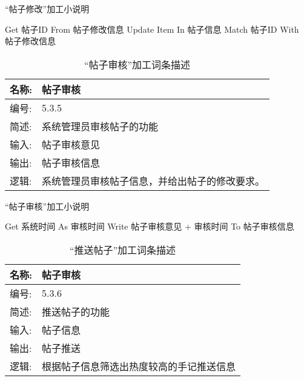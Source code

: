 \begin{algorithm}[H] 
    \renewcommand{\thealgorithm}{}
    \caption{“帖子修改”加工小说明} 
    \label{alg3} 
    \begin{algorithmic}[1]
        \STATE Get 帖子ID From 帖子修改信息
        \STATE Update Item In 帖子信息 Match 帖子ID With 帖子修改信息
    \end{algorithmic} 
\end{algorithm}

\begin{table}[H]  
\caption{“帖子审核”加工词条描述}  
\begin{center}  
    \begin{tabular}{l p{11cm}} 
        \hline
        \quad 名称:  &  帖子审核 \\
        \hline
        \quad 编号:  & 5.3.5 \\
        \hline
        \quad 简述:  & 系统管理员审核帖子的功能 \\
        \hline
        \quad 输入:  & 帖子审核意见 \\
        \hline
        \quad 输出:  & 帖子审核信息 \\
        \hline
        \quad 逻辑:  & 系统管理员审核帖子信息，并给出帖子的修改要求。 \\
        \hline
    \end{tabular}
    \label{tab1}
\end{center}
\end{table}

\begin{algorithm}[H]
    \renewcommand{\thealgorithm}{}
    \caption{“帖子审核”加工小说明} 
    \label{alg3} 
    \begin{algorithmic}[1]
        \STATE Get 系统时间 As 审核时间
        \STATE Write 帖子审核意见 + 审核时间 To 帖子审核信息
    \end{algorithmic} 
\end{algorithm}

\begin{table}[H]  
\caption{“推送帖子”加工词条描述}  
\begin{center}  
    \begin{tabular}{l p{11cm}} 
        \hline
        \quad 名称:  &  帖子审核 \\
        \hline
        \quad 编号:  & 5.3.6 \\
        \hline
        \quad 简述:  & 推送帖子的功能 \\
        \hline
        \quad 输入:  & 帖子信息 \\
        \hline
        \quad 输出:  & 帖子推送 \\
        \hline
        \quad 逻辑:  & 根据帖子信息筛选出热度较高的手记推送信息\\
        \hline
    \end{tabular}
    \label{tab1}
\end{center}
\end{table}

